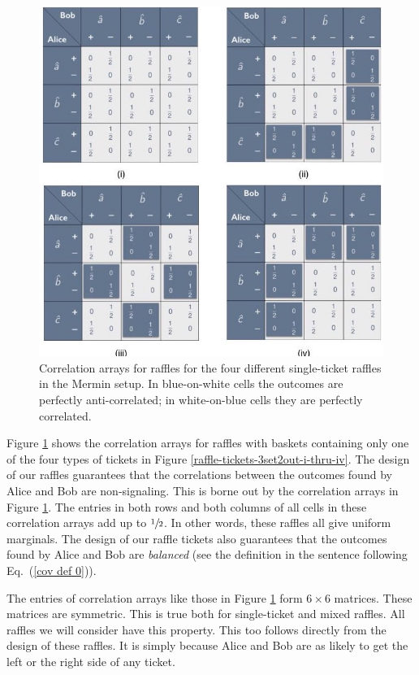 \begin{figure}[ht]   
 \centering
   \includegraphics[width=4.5in]{CA-3set2out-raffles-i-thru-iv.jpeg} 
   \caption{Correlation arrays for raffles for the four different single-ticket raffles in the Mermin setup. In blue-on-white cells the outcomes are perfectly anti-correlated; in white-on-blue cells they are perfectly correlated.}
   \label{CA-3set2out-raffles-i-thru-iv}
\end{figure}

Figure \ref{CA-3set2out-raffles-i-thru-iv} shows the correlation arrays for raffles with baskets containing only one of the four types of tickets in Figure \ref{raffle-tickets-3set2out-i-thru-iv}. The design of our raffles guarantees that the correlations between the outcomes found by Alice and Bob are non-signaling. This is borne out by the correlation arrays in Figure \ref{CA-3set2out-raffles-i-thru-iv}. The entries in both rows and both columns of all cells in these correlation arrays add up to $\sfrac12$. In other words, these raffles all give uniform marginals. The design of our raffle tickets also guarantees that the outcomes found by Alice and Bob are \emph{balanced} (see the definition in the sentence following  Eq.\ (\ref{cov def 0})).

The entries of correlation arrays like those in Figure \ref{CA-3set2out-raffles-i-thru-iv} form $6 \times 6$ matrices. These matrices are symmetric. This is true both for single-ticket and mixed raffles. All raffles we will consider have this property. This too follows directly from the design of these raffles. It is simply because Alice and Bob are as likely to get the left or the right side of any ticket. 

